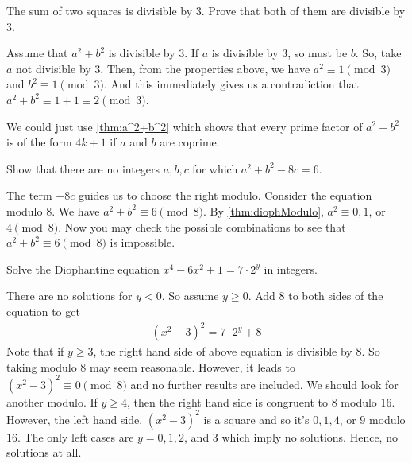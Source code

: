 \documentclass{subfile}
\begin{document}
				\begin{problem}
					The sum of two squares is divisible by $3$. Prove that both of them are divisible by $3$.
				\end{problem}

				\begin{solution}
					Assume that $a^2+b^2$ is divisible by $3$. If $a$ is divisible by $3$, so must be $b$. So, take $a$ not divisible by $3$. Then, from the properties above, we have $a^2\equiv1\pmod3$ and $b^2\equiv1\pmod3$. And this immediately gives us a contradiction that $a^2+b^2\equiv1+1\equiv2\pmod3$.
				\end{solution}

				\begin{remark}
					We could just use \autoref{thm:a^2+b^2} which shows that every prime factor of $a^2+b^2$ is of the form $4k+1$ if $a$ and $b$ are coprime.
				\end{remark}

				\begin{problem}
					Show that there are no integers $a,b,c$ for which $a^2+b^2-8c=6$.
				\end{problem}

				\begin{solution}
					The term $-8c$ guides us to choose the right modulo. Consider the equation modulo $8$. We have $a^2+b^2\equiv 6\pmod{8}$. By \autoref{thm:diophModulo}, $a^2\equiv 0, 1$, or  $4\pmod{8}$. Now you may check the possible combinations to see that $a^2+b^2\equiv 6\pmod{8}$ is impossible.
				\end{solution}

				\begin{problem}
					Solve the Diophantine equation $x^4-6x^2+1=7 \cdot 2^y$ in integers.
				\end{problem}

				\begin{solution}
					There are no solutions for $y<0$. So assume $y\geq 0$. Add $8$ to both sides of the equation to get
						\begin{align*}
							 (x^2-3)^2=7\cdot 2^y+8
						\end{align*}
					Note that if $y \geq 3$, the right hand side of above equation is divisible by $8$. So taking modulo $8$ may seem reasonable. However, it leads to $(x^2-3)^2 \equiv 0 \pmod 8$ and no further results are included. We should look for another modulo. If $y \geq 4$, then the right hand side is congruent to $8$ modulo $16$. However, the left hand side, $(x^2-3)^2$ is a square and so it's $0, 1, 4$, or $9$ modulo $16$. The only left cases are $y=0,1,2$, and $3$ which imply no solutions. Hence, no solutions at all.
				\end{solution}
\end{document}
